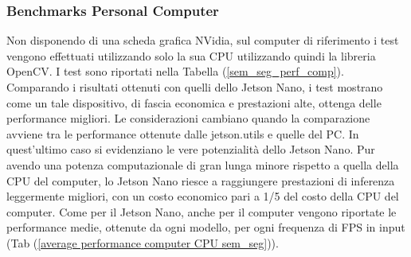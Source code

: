 \subsubsection{Benchmarks Personal Computer}
Non disponendo di una scheda grafica NVidia, sul computer di riferimento i 
test vengono effettuati utilizzando solo la sua CPU utilizzando quindi la 
libreria OpenCV. I test sono riportati nella Tabella (\ref{sem_seg_perf_comp}). Comparando 
i risultati ottenuti con quelli dello Jetson Nano, i test mostrano come 
un tale dispositivo, di fascia economica e prestazioni alte, ottenga delle 
performance migliori. Le considerazioni cambiano quando la comparazione 
avviene tra le performance ottenute dalle jetson.utils e quelle del PC. In 
quest'ultimo caso si evidenziano le vere potenzialità dello Jetson Nano. Pur 
avendo una potenza computazionale di gran lunga minore rispetto a quella 
della CPU del computer, lo Jetson Nano riesce a raggiungere prestazioni di inferenza 
leggermente migliori, con un costo economico pari a 1/5 del costo della CPU 
del computer. Come per il Jetson Nano, anche per il computer vengono 
riportate le performance medie, ottenute da ogni modello, per ogni frequenza 
di FPS in input (Tab (\ref{average performance computer CPU sem_seg})).


